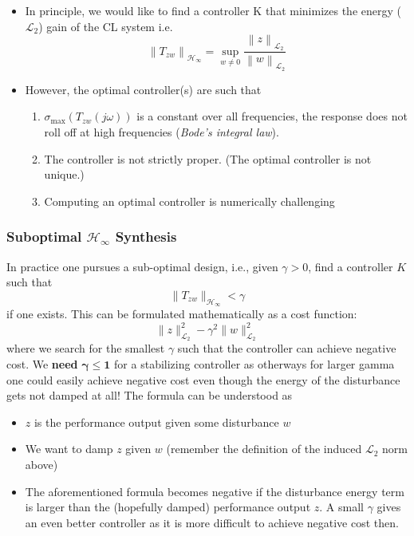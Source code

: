 \newpar{}
\begin{itemize}
    \item In principle, we would like to find a controller K that minimizes the energy ($\mathcal{L}_2$) gain of the CL system i.e.
          \begin{equation*}
              \left\|T_{zw}\right\|_{\mathcal{H}_\infty}=\sup_{w\neq0}\frac{\left\|z\right\|_{\mathcal{L}_2}}{\left\|w\right\|_{\mathcal{L}_2}}
          \end{equation*}
    \item However, the optimal controller(s) are such that
          \begin{enumerate}
              \item $\sigma_{\max}(T_{zw}(j\omega))$ is a constant over all frequencies, the response does not roll off at high frequencies (\textit{Bode's integral law}).
              \item The controller is not strictly proper. (The optimal controller is not unique.)
              \item Computing an optimal controller is numerically challenging
          \end{enumerate}
\end{itemize}

\subsubsection{Suboptimal \texorpdfstring{$\mathcal{H}_\infty$}{H-infinity} Synthesis}
In practice one pursues a sub-optimal design, i.e., given $\gamma>0$, find a controller $K$ such that
\begin{equation*}
    \|T_{zw}\|_{\mathcal{H}_\infty}<\gamma
\end{equation*}
if one exists. This can be formulated mathematically as a cost function:
\begin{equation*}
    \|z\|_{\mathcal{L}_2}^2-\gamma^2\|w\|_{\mathcal{L}_2}^2
\end{equation*}
where we search for the smallest $\gamma$ such that the controller can achieve negative cost. We \textbf{need} $\boldsymbol{\gamma}\mathbf{\le1}$ for a stabilizing controller as otherways for larger gamma one could easily achieve negative cost even though the energy of the disturbance gets not damped at all! The formula can be understood as
\begin{itemize}
    \item $z$ is the performance output given some disturbance $w$
    \item We want to damp $z$ given $w$ (remember the definition of the induced $\mathcal{L}_2$ norm above)
    \item The aforementioned formula becomes negative if the disturbance energy term is larger than the (hopefully damped) performance output $z$. A small $\gamma$ gives an even better controller as it is more difficult to achieve negative cost then.
\end{itemize}

